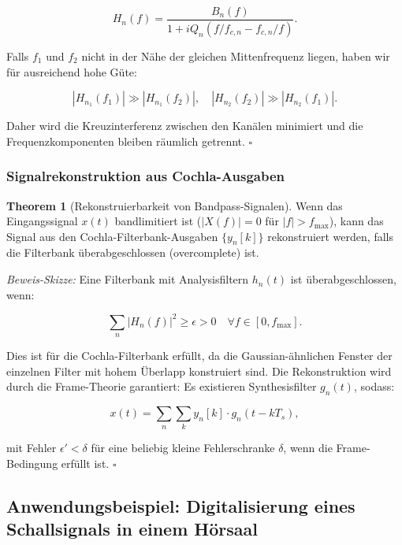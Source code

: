 ﻿\documentclass[12pt, a4paper]{article}
\theoremstyle{definition}
\newtheorem{theorem}{Theorem}[section]
\theoremstyle{remark}
\begin{document}
\begin{equation}
H_n(f) = \frac{B_n(f)}{1 + i Q_n (f/f_{c,n} - f_{c,n}/f)}.
\end{equation}

Falls $f_1$ und $f_2$ nicht in der Nähe der gleichen Mittenfrequenz liegen, 
haben wir für ausreichend hohe Güte:

\begin{equation}
|H_{n_1}(f_1)| \gg |H_{n_1}(f_2)|, \quad |H_{n_2}(f_2)| \gg |H_{n_2}(f_1)|.
\end{equation}

Daher wird die Kreuzinterferenz zwischen den Kanälen minimiert und die 
Frequenzkomponenten bleiben räumlich getrennt. $\square$

\subsubsection{Signalrekonstruktion aus Cochla-Ausgaben}

\begin{theorem}[Rekonstruierbarkeit von Bandpass-Signalen]
\label{thm:reconstruction}
Wenn das Eingangssignal $x(t)$ bandlimitiert ist ($|X(f)| = 0$ für $|f| > f_{\max}$), 
kann das Signal aus den Cochla-Filterbank-Ausgaben $\{y_n[k]\}$ rekonstruiert werden, 
falls die Filterbank überabgeschlossen (overcomplete) ist.
\end{theorem}

\emph{Beweis-Skizze:} Eine Filterbank mit Analysisfiltern $h_n(t)$ ist 
überabgeschlossen, wenn:

\begin{equation}
\sum_n |H_n(f)|^2 \geq \epsilon > 0 \quad \forall f \in [0, f_{\max}].
\end{equation}

Dies ist für die Cochla-Filterbank erfüllt, da die Gaussian-ähnlichen Fenster 
der einzelnen Filter mit hohem Überlapp konstruiert sind. Die Rekonstruktion 
wird durch die Frame-Theorie garantiert: Es existieren Synthesisfilter $g_n(t)$, 
sodass:

\begin{equation}
x(t) = \sum_n \sum_k y_n[k] \cdot g_n(t - k T_s),
\end{equation}

mit Fehler $\epsilon' < \delta$ für eine beliebig kleine Fehlerschranke $\delta$, 
wenn die Frame-Bedingung erfüllt ist. $\square$

\subsection{Anwendungsbeispiel: Digitalisierung eines Schallsignals in einem Hörsaal}
\end{document}
